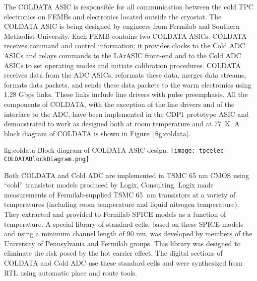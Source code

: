 The COLDATA ASIC is responsible for all communication between the cold TPC electronics on FEMBs and electronics located outside the cryostat.  The COLDATA ASIC is being designed by engineers from Fermilab and Southern Methodist University.  Each FEMB contains two COLDATA ASICs.  COLDATA receives command and control information; it provides clocks to the Cold ADC ASICs and relays commands to the LArASIC front-end and to the Cold ADC ASICs to set operating modes and initiate calibration procedures.  COLDATA receives data from the ADC ASICs, reformats these data, merges data streams, formats data packets, and sends these data packets to the warm electronics using 1.28 Gbps links.  These links include line drivers with pulse preemphasis.  All the components of COLDATA, with the exception of the line drivers and of the interface to the ADC, have been implemented in the CDP1 prototype ASIC and demonstrated to work as designed both at room temperature and at 77~K.  A block diagram of COLDATA is shown in Figure~\ref{fig:coldata}.  

\begin{dunefigure}
{fig:coldata}
{Block diagram of COLDATA ASIC design.}
\texttt{[image: tpcelec-COLDATABlockDiagram.png]}
\end{dunefigure}

Both COLDATA and Cold ADC are implemented in TSMC 65 nm CMOS using ``cold'' transistor models produced by Logix, Consulting.  Logix made measurements of Fermilab-supplied TSMC 65~nm transistors at a variety of temperatures (including room temperature and liquid nitrogen temperature).  They extracted and provided to Fermilab SPICE models as a function of temperature.  A special library of standard cells, based on these SPICE models and using a minimum channel length of 90 nm, was developed by members of the University of Pennsylvania and Fermilab groups.  This library was designed to eliminate the risk posed by the hot carrier effect.  The digital sections of COLDATA and Cold ADC use these standard cells and were synthesized from RTL using automatic place and route tools.
